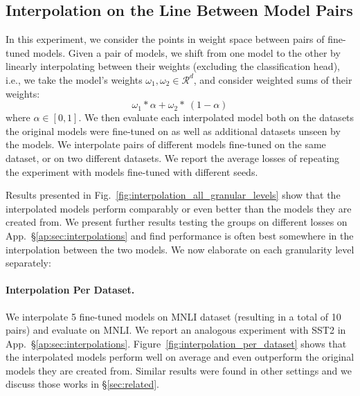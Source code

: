 \documentclass[nohyperref]{article}
\theoremstyle{plain}
\theoremstyle{definition}
\theoremstyle{remark}
\begin{document}
\subsection{Interpolation on the Line Between Model Pairs} \label{sec:interpolations}
In this experiment, we consider the points in weight space between pairs of fine-tuned models. Given a pair of models, we shift from one model to the other by linearly interpolating between their weights (excluding the classification head), i.e., we take the model's weights $\omega_{1},\omega_{2}\in\mathcal{R}^d$, and consider weighted sums of their weights: 
\begin{equation}\label{equation:weighted_avg}
\omega_{1} * \alpha + \omega_{2} * \ (1-\alpha) 
\end{equation}
where $ \alpha \in [0,1]$.
We then evaluate each interpolated model both on the datasets the original models were fine-tuned on as well as additional datasets unseen by the models. 
We interpolate pairs of different models fine-tuned on the same dataset, or on two different datasets.
We report the average losses of repeating the experiment with models fine-tuned with different seeds.

Results presented in Fig.~\ref{fig:interpolation_all_granular_levels} show that the interpolated models perform comparably or even better than the models they are created from. We present further results testing the groups on different losses on App.~\S\ref{ap:sec:interpolations} and find performance is often best somewhere in the interpolation between the two models. 
We now elaborate on each granularity level separately: 


\paragraph{Interpolation Per Dataset.} We interpolate 5 fine-tuned models on MNLI dataset (resulting in a total of 10 pairs) and evaluate on MNLI. We report an analogous experiment with SST2 in App.~\S\ref{ap:sec:interpolations}.
Figure~\ref{fig:interpolation_per_dataset} shows that the interpolated models perform well on average and even outperform the original models they are created from. Similar results were found in other settings \citep[e.g.;][]{Wortsman2022ModelSA} and we discuss those works in \S\ref{sec:related}.
\end{document}
